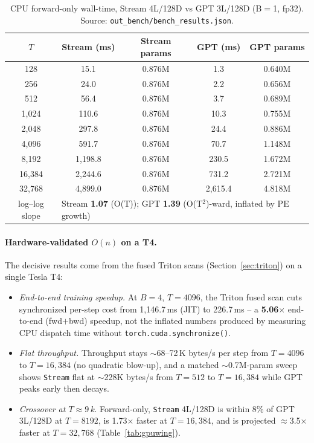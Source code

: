 \documentclass[11pt]{article}
\newcommand{\Stream}{\texttt{Stream}}
\begin{document}
\begin{table}[t]
  \centering
  \small
  \begin{tabular}{ccccc}
    \toprule
    $T$ & Stream (ms) & Stream params & GPT (ms) & GPT params \\
    \midrule
    128     & 15.1  & 0.876M & 1.3  & 0.640M \\
    256     & 24.0  & 0.876M & 2.2  & 0.656M \\
    512     & 56.4  & 0.876M & 3.7  & 0.689M \\
    1{,}024 & 110.6 & 0.876M & 10.3 & 0.755M \\
    2{,}048 & 297.8 & 0.876M & 24.4 & 0.886M \\
    4{,}096 & 591.7 & 0.876M & 70.7 & 1.148M \\
    8{,}192 & 1,198.8 & 0.876M & 230.5 & 1.672M \\
    16{,}384 & 2,244.6 & 0.876M & 731.2 & 2.721M \\
    32{,}768 & 4,899.0 & 0.876M & 2,615.4 & 4.818M \\
    \midrule
    log--log slope & \multicolumn{4}{l}{Stream \textbf{1.07} (O(T)); GPT \textbf{1.39} (O(T$^2$)-ward, inflated by PE growth)} \\
    \bottomrule
  \end{tabular}
  \caption{CPU forward-only wall-time, Stream 4L/128D vs GPT 3L/128D
  (B$=$1, fp32). Source: \texttt{out\_bench/bench\_results.json}.}
  \label{tab:cpu}
\end{table}

\paragraph{Hardware-validated $O(n)$ on a T4.}
The decisive results come from the fused Triton scans (Section~\ref{sec:triton})
on a single Tesla T4:
\begin{itemize}
  \item \emph{End-to-end training speedup.} At $B{=}4$, $T{=}4096$, the Triton
        fused scan cuts synchronized per-step cost from 1{,}146.7\,ms (JIT) to
        226.7\,ms -- a \textbf{5.06$\times$} end-to-end (fwd$+$bwd) speedup, not
        the inflated numbers produced by measuring CPU dispatch time without
        \texttt{torch.cuda.synchronize()}.
  \item \emph{Flat throughput.} Throughput stays $\sim$68--72\,K bytes/s per step
        from $T{=}4096$ to $T{=}16{,}384$ (no quadratic blow-up), and a matched
        $\sim$0.7M-param sweep shows \Stream{} flat at $\sim$228K bytes/s from
        $T{=}512$ to $T{=}16{,}384$ while GPT peaks early then decays.
  \item \emph{Crossover at $T\approx9$\,k.} Forward-only, \Stream{} 4L/128D is
        within 8\% of GPT 3L/128D at $T{=}8192$, is 1.73$\times$ faster at
        $T{=}16{,}384$, and is projected $\approx$3.5$\times$ faster at
        $T{=}32{,}768$ (Table~\ref{tab:gpuwing}).
\end{itemize}
\end{document}
